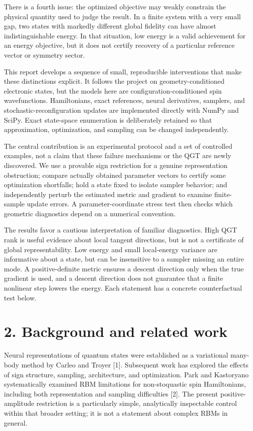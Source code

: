 \documentclass[
  11pt,
  a4paper,
]{article}
\begin{document}
There is a fourth issue: the optimized objective may weakly constrain
the physical quantity used to judge the result. In a finite system with
a very small gap, two states with markedly different global fidelity can
have almost indistinguishable energy. In that situation, low energy is a
valid achievement for an energy objective, but it does not certify
recovery of a particular reference vector or symmetry sector.

This report develops a sequence of small, reproducible interventions
that make these distinctions explicit. It follows the project on
geometry-conditioned electronic states, but the models here are
configuration-conditioned spin wavefunctions. Hamiltonians, exact
references, neural derivatives, samplers, and stochastic-reconfiguration
updates are implemented directly with NumPy and SciPy. Exact state-space
enumeration is deliberately retained so that approximation,
optimization, and sampling can be changed independently.

The central contribution is an experimental protocol and a set of
controlled examples, not a claim that these failure mechanisms or the
QGT are newly discovered. We use a provable sign restriction for a
genuine representation obstruction; compare actually obtained parameter
vectors to certify some optimization shortfalls; hold a state fixed to
isolate sampler behavior; and independently perturb the estimated metric
and gradient to examine finite-sample update errors. A
parameter-coordinate stress test then checks which geometric diagnostics
depend on a numerical convention.

The results favor a cautious interpretation of familiar diagnostics.
High QGT rank is useful evidence about local tangent directions, but is
not a certificate of global representability. Low energy and small
local-energy variance are informative about a state, but can be
insensitive to a sampler missing an entire mode. A positive-definite
metric ensures a descent direction only when the true gradient is used,
and a descent direction does not guarantee that a finite nonlinear step
lowers the energy. Each statement has a concrete counterfactual test
below.

\hypertarget{background-and-related-work}{%
\section{2. Background and related
work}\label{background-and-related-work}}

Neural representations of quantum states were established as a
variational many-body method by Carleo and Troyer {[}1{]}. Subsequent
work has explored the effects of sign structure, sampling, architecture,
and optimization. Park and Kastoryano systematically examined RBM
limitations for non-stoquastic spin Hamiltonians, including both
representation and sampling difficulties {[}2{]}. The present
positive-amplitude restriction is a particularly simple, analytically
inspectable control within that broader setting; it is not a statement
about complex RBMs in general.
\end{document}
